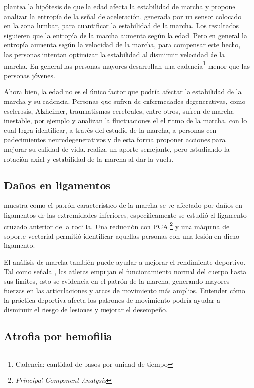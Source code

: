 \cite{arif} plantea la hipótesis de que la edad afecta la estabilidad de marcha y propone analizar la entropía de la señal de aceleración, generada por un sensor colocado en la zona lumbar, para cuantificar la estabilidad de la marcha. Los resultados siguieren que la entropía de la marcha aumenta según la edad. Pero en general la entropía aumenta según la velocidad de la marcha, para compensar este hecho, las personas intentan optimizar la estabilidad al disminuir velocidad de la marcha. En general las personas mayores desarrollan una cadencia\footnote{Cadencia: cantidad de pasos por unidad de tiempo} menor que las personas jóvenes. 

Ahora bien, la edad no es el único factor que podría afectar la estabilidad de la marcha y su cadencia. Personas que sufren de enfermedades degenerativas, como esclerosis, Alzheimer, traumatismos cerebrales, entre otros, sufren de marcha inestable, por ejemplo \cite{ren} y \cite{wu} analizan la fluctuaciones el el ritmo de la marcha, con lo cual logra identificar, a través del estudio de la marcha, a personas con padecimientos neurodegenerativos y de esta forma proponer acciones para mejorar su calidad de vida. \cite{yang} realiza un aporte semejante, pero estudiando la rotación axial y estabilidad de la marcha al dar la vuela.  

\subsection{Daños en ligamentos}

\cite{christian} muestra como el patrón característico de la marcha se ve afectado por daños en ligamentos de las extremidades inferiores, específicamente se estudió el ligamento cruzado anterior de la rodilla. Una reducción con PCA \footnote{\emph{Principal Component Analysis}} y una máquina de soporte vectorial permitió identificar aquellas personas con una lesión en dicho ligamento. 

El análisis de marcha también puede ayudar a mejorar el rendimiento deportivo. Tal como señala \cite{perry}, los atletas empujan el funcionamiento normal del cuerpo hasta sus límites, esto se evidencia en el patrón de la marcha, generando mayores fuerzas en las articulaciones y arcos de movimiento más amplios. Entender cómo la práctica deportiva afecta los patrones de movimiento podría ayudar a disminuir el riesgo de lesiones y mejorar el desempeño.  

\subsection{Atrofia por hemofilia}

